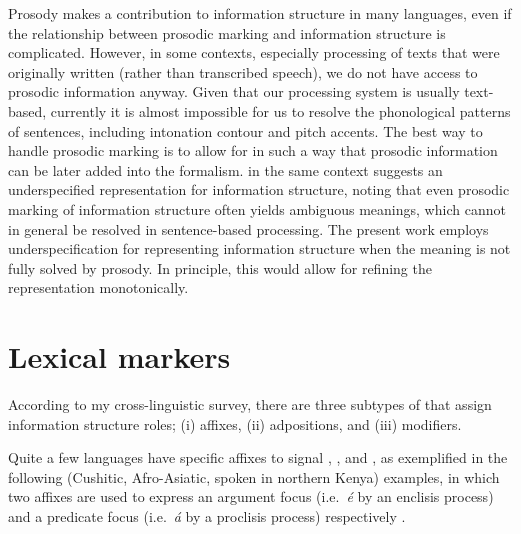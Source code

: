 Prosody makes a contribution to information structure in many
languages, even if the relationship between prosodic
marking and information structure is complicated. However, in some
contexts, especially processing of texts that were originally written
(rather than transcribed speech), we do not have access to prosodic
information anyway.  Given that our processing system is usually
text-based, currently it is almost impossible for us to resolve the
phonological patterns of sentences, including intonation contour and
pitch accents.  The best way to handle prosodic marking is to allow
for  in such a way that prosodic information
can be later added into the formalism.  \citet{kuhn:96} in the same
context suggests an underspecified representation for information
structure, noting that even prosodic marking of information structure
often yields ambiguous meanings, which cannot in general be resolved
in sentence-based processing.  The present work employs
underspecification for representing information structure when the
meaning is not fully solved by prosody. In
principle, this would allow for refining the representation
monotonically.



\section{Lexical markers}
\label{4:sec:lexical}


According to my cross-linguistic survey, there are three subtypes of
 that assign information structure roles; (i) affixes,
(ii) adpositions, and (iii) modifiers.

Quite a few languages have specific affixes to signal , ,
and , as exemplified in the following  (Cushitic,
Afro-Asiatic, spoken in northern Kenya) examples, in which two affixes
are used to express an argument focus (i.e.\ \textit{{\'e}} by an
enclisis process) and a predicate focus (i.e.\ \textit{{\'a}} by a
proclisis process) respectively \citep{lecarme:99}.




